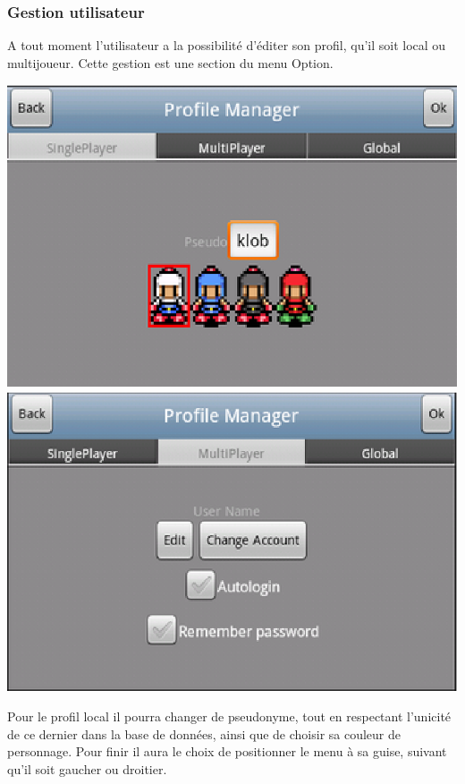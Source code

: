 	\subsubsection{Gestion utilisateur}
	A tout moment l'utilisateur a la possibilité d'éditer son profil, qu'il
	soit local ou multijoueur. Cette gestion est une section du menu Option.
		\begin{center}						
			\includegraphics[scale=0.6]{Developpement/Img/5.eps}
			\includegraphics[scale=0.6]{Developpement/Img/6.eps}
		\end{center}
	Pour le profil local il pourra changer de pseudonyme, tout en respectant l'unicité de
	ce dernier dans la base de données, ainsi que de choisir sa couleur de
	personnage. Pour finir il aura le choix de positionner le menu à sa
	guise, suivant qu'il soit gaucher ou droitier.
	
